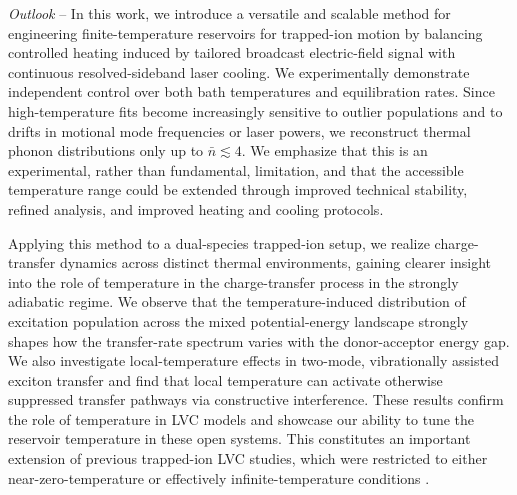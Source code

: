 \documentclass[
reprint,
superscriptaddress,

amsmath,amssymb,
aps,
prl,

floatfix,
]{revtex4-2}
\begin{document}

\emph{Outlook} -- In this work, we introduce a versatile and scalable method for engineering finite-temperature reservoirs for trapped-ion motion by balancing controlled heating induced by tailored broadcast electric-field signal with continuous resolved-sideband laser cooling. We experimentally demonstrate independent control over both bath temperatures and equilibration rates. Since high-temperature fits become increasingly sensitive to outlier populations and to drifts in motional mode frequencies or laser powers, we reconstruct thermal phonon distributions only up to $\bar{n}\lesssim 4$. We emphasize that this is an experimental, rather than fundamental, limitation, and that the accessible temperature range could be extended through improved technical stability, refined analysis, and improved heating and cooling protocols.

Applying this method to a dual-species trapped-ion setup, we realize charge-transfer dynamics across distinct thermal environments, gaining clearer insight into the role of temperature in the charge-transfer process in the strongly adiabatic regime. We observe that the temperature-induced distribution of excitation population across the mixed potential-energy landscape strongly shapes how the transfer-rate spectrum varies with the donor-acceptor energy gap. We also investigate local-temperature effects in two-mode, vibrationally assisted exciton transfer and find that local temperature can activate otherwise suppressed transfer pathways via constructive interference. These results confirm the role of temperature in LVC models and showcase our ability to tune the reservoir temperature in these open systems. This constitutes an important extension of previous trapped-ion LVC studies, which were restricted to either near-zero-temperature \cite{so2024electrontransfer,so2025multimode} or effectively infinite-temperature conditions \cite{sun2025quantum,navickas2025chemical}.
\end{document}
